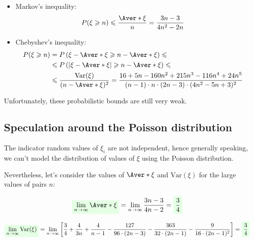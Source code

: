 \documentclass{article}
\newcommand{\highlight}[1]{\colorbox{green!10}{$\displaystyle#1$}}
\newcommand{\Var}{\mathrm{Var}}
\begin{document}
\begin{itemize}

	\item Markov's inequality:
	\begin{equation}
		P(\xi \geqslant n) \leqslant {\Aver*{\xi} \over n} = {3n - 3 \over 4n^2 - 2n}
	\end{equation}
	
	\item Chebyshev's inequality:
	\begin{equation}
	\begin{split}
		P(\xi \geqslant n) & = P\left(\xi - \Aver*{\xi} \geqslant n - \Aver*{\xi} \right) \leqslant \\
					   & \leqslant P\left( \left| \xi - \Aver*{\xi} \right| \geqslant n - \Aver*{\xi} \right) \leqslant \\
					   & \leqslant {\Var(\xi) \over (n - \Aver*{\xi})^2} = {16 + 5n - 160n^2 + 215n^3 - 116n^4 + 24n^5 \over (n - 1) \cdot n \cdot (2n - 3) \cdot (4n^2 - 5n + 3)^2}
	\end{split}
	\end{equation}

\end{itemize}

Unfortunately, these probabilistic bounds are still very weak.

\subsection{Speculation around the Poisson distribution} \label{poisson-distribution}

The indicator random values of $\xi_i$ are not independent, hence generally speaking, we can't model the distribution of values of $\xi$ using the Poisson distribution.

Nevertheless, let's consider the values of $\Aver*{\xi}$ and $\Var(\xi)$ for the large values of pairs $n$:

\begin{equation}
	\highlight{\lim_{n\to\infty} \Aver*{\xi}} = \lim_{n\to\infty} {3n - 3 \over 4n - 2} = \highlight{{3 \over 4}}
\end{equation}

\begin{equation}
	\highlight{\lim_{n\to\infty} \Var(\xi)} = \lim_{n\to\infty} \left[ {3 \over 4} + {4 \over 3n} + {4 \over n - 1} - {127 \over 96 \cdot (2n - 3)} - {363 \over 32 \cdot (2n - 1)} - {9 \over 16 \cdot (2n - 1)^2} \right] = \highlight{{3 \over 4}}
\end{equation}
\end{document}

